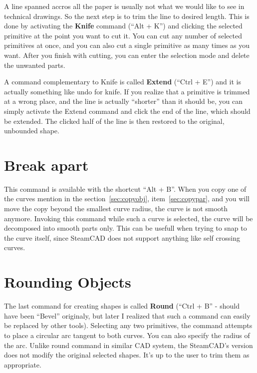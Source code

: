 A line spanned accros all the paper is usually not what we would like to see in technical
drawings. So the next step is to trim the line to desired length. This is done by
activating the \textbf{Knife} command (``Alt + K'') and clicking the selected primitive at the
point you want to cut it. You can cut any number of selected primitives at once,
and you can also cut a single primitive as many times as you want. After you finish
with cutting, you can enter the selection mode and delete the unwanted parts.

A command complementary to Knife is called \textbf{Extend} (``Ctrl + E'') and it is
actually something like undo for knife. If you realize that a primitive is trimmed
at a wrong place, and the line is actually ``shorter'' than it should be, you can simply
activate the Extend command and click the end of the line, which should be extended.
The clicked half of the line is then restored to the original, unbounded shape.

\section{Break apart}
This command is available with the shortcut ``Alt + B''. When you copy one of the curves
mention in the section~\ref{sec:copyobj}, item~\ref{sec:copypar}, and you will move the
copy beyond the smallest curve radius, the curve is not smooth anymore. Invoking this
command while such a curve is selected, the curve will be decomposed into smooth parts only.
This can be usefull when trying to snap to the curve itself, since SteamCAD does not support
anything like self crossing curves.

\section{Rounding Objects}

The last command for creating shapes is called \textbf{Round} (``Ctrl + B'' - should have
been ``Bevel'' originaly, but later I realized that such a command can easily be replaced
by other tools). Selecting any two primitives, the command attempts to place a circular
arc tangent to both curves. You can also specify the radius of the arc. Unlike round
command in similar CAD system, the SteamCAD's version does not modify the original
selected shapes. It's up to the user to trim them as appropriate.

